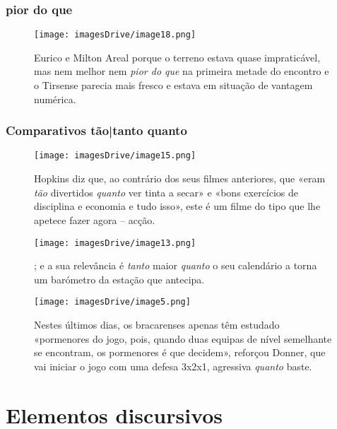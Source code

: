 \documentclass[output=paper,colorlinks,citecolor=brown]{langscibook}
\begin{document}
	\subsubsection{pior do que}

	\begin{figure}
	    \centering
	    \texttt{[image: imagesDrive/image18.png]}
	    \caption{Eurico e Milton Areal porque o terreno estava quase impraticável, mas nem melhor nem \emph{pior do que} na primeira metade do encontro e o Tirsense parecia mais fresco e estava em situação de vantagem numérica.}
	    \label{fig:comparative4}
	\end{figure}{}


	\subsubsection{Comparativos tão|tanto quanto}

	\begin{figure}
	    \centering
	    \texttt{[image: imagesDrive/image15.png]}
	    \caption{Hopkins diz que, ao contrário dos seus filmes anteriores, que «eram \emph{tão} divertidos \emph{quanto} ver tinta a secar» e «bons exercícios de disciplina e economia e tudo isso», este é um filme do tipo que lhe apetece fazer agora -- acção.}
	    \label{fig:comparative4}
	\end{figure}{}

	\begin{figure}
	    \centering
	    \texttt{[image: imagesDrive/image13.png]}
	    \caption{; e a sua relevância é \emph{tanto} maior \emph{quanto} o seu calendário a torna um barómetro da estação que antecipa.}
	    \label{fig:comparative4}
	\end{figure}{}

	\begin{figure}
	    \centering
	    \texttt{[image: imagesDrive/image5.png]}
	    \caption{Nestes últimos dias, os bracarenses apenas têm estudado «pormenores do jogo, pois, quando duas equipas de nível semelhante se encontram, os pormenores é que decidem», reforçou Donner, que vai iniciar o jogo com uma defesa 3x2x1, agressiva \emph{quanto} baste.}
	    \label{fig:comparative4}
	\end{figure}{}
	
\section{Elementos discursivos}
\end{document}
